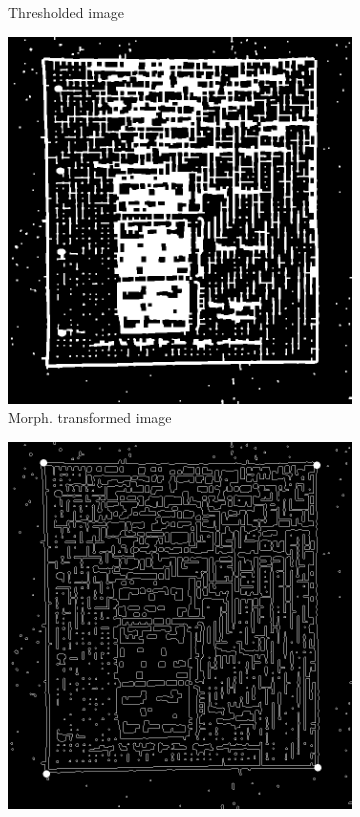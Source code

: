 \documentclass{scrartcl}
\begin{document}
\begin{figure}[!htbp]
\begin{subfigure}[b]{0.3\textwidth}
      \caption{Thresholded image}
    \end{subfigure}
    \begin{subfigure}[b]{0.3\textwidth}
      \centering
      \includegraphics[width=\textwidth]{pictures/results/reference1/morphology.png}
      \caption{Morph. transformed image}
    \end{subfigure}
    \begin{subfigure}[b]{0.3\textwidth}
      \centering
      \includegraphics[width=\textwidth]{pictures/results/reference1/edge-detector.png}

\end{subfigure}
\end{figure}
\end{document}
